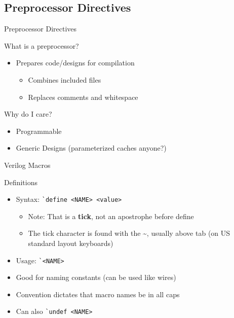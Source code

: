 \documentclass[dvipsnames]{beamer}
\begin{document}
\subsection{Preprocessor Directives}
\begin{frame}{Preprocessor Directives}
	\begin{block}{What is a preprocessor?}
		\begin{itemize}
			\item Prepares code/designs for compilation
				\begin{itemize}
					\item Combines included files
					\item Replaces comments and whitespace
				\end{itemize}
		\end{itemize}
	\end{block}
	\begin{block}{Why do I care?}
		\begin{itemize}
			\item Programmable
			\item Generic Designs (parameterized caches anyone?)
		\end{itemize}
	\end{block}
\end{frame}

\begin{frame}{Verilog Macros}
	\begin{block}{Definitions}
		\begin{itemize}
			\item Syntax: \texttt{\`{}define <NAME> <value>} 
				\begin{itemize}
					\item Note: That is a \textbf{tick}, not an apostrophe 
						before define
					\item The tick character is found with the \~{}, usually
						above tab (on US standard layout keyboards)
				\end{itemize}
			\item Usage: \texttt{\`{}<NAME>}
			\item Good for naming constants (can be used like wires)
			\item Convention dictates that macro names be in all caps
			\item Can also \texttt{\`{}undef <NAME>}
		\end{itemize}
	\end{block}
\end{frame}
\end{document}
